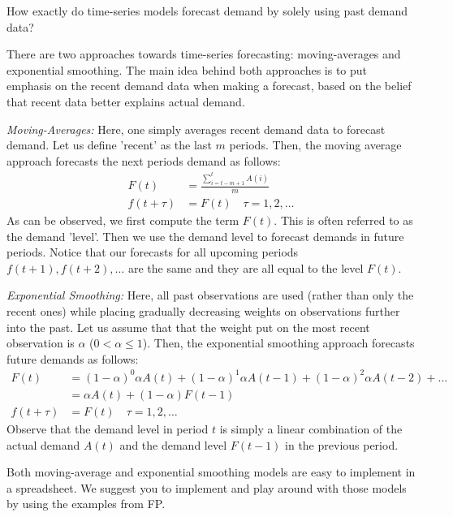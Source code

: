 \begin{question}
How exactly do time-series models forecast demand by solely using past demand data?

\end{question}

  \begin{solution}
There are two approaches towards time-series forecasting: moving-averages and exponential smoothing. The main idea behind both approaches is to put emphasis on the recent demand data when making a forecast, based on the belief that recent data better explains actual demand.

\textit{Moving-Averages:} 
Here, one simply averages recent demand data to forecast demand. Let us define 'recent' as the last $m$ periods. Then, the moving average approach forecasts the next periods demand as follows:
\begin{align*}
F(t) & = \frac{\sum_{i=t-m+1}^t A(i)}{m} \\
f(t+\tau) & = F(t) \quad \tau = 1,2,\ldots
\end{align*}
As can be observed, we first compute the term $F(t)$. This is often referred to as the demand 'level'. Then we use the demand level to forecast demands in future periods. Notice that our forecasts for all upcoming periods $f(t+1),f(t+2),\ldots$ are the same and they are all equal to the level $F(t)$. 

\textit{Exponential Smoothing:} 
Here, all past observations are used (rather than only the recent ones) while placing gradually decreasing weights on observations further into the past. Let us assume that that the weight put on the most recent observation is $\alpha$ ($0<\alpha\leq 1$). Then, the exponential smoothing approach forecasts future demands as follows:
\begin{align*}
F(t) & = (1-\alpha)^0 \alpha A(t) + (1-\alpha)^1 \alpha A(t-1) + (1-\alpha)^2 \alpha A(t-2) + \ldots \\
& = \alpha A(t) + (1-\alpha) F(t-1) \\
f(t+\tau) & = F(t) \quad \tau = 1,2,\ldots
\end{align*}
Observe that the demand level in period $t$ is simply a linear combination of the actual demand $A(t)$ and the demand level $F(t-1)$ in the previous period. 


Both moving-average and exponential smoothing models are easy to implement in a spreadsheet. We suggest you to implement and play around with those models by using the examples from FP.
  \end{solution}


